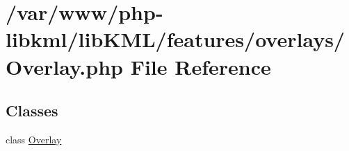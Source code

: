 \hypertarget{Overlay_8php}{
\section{/var/www/php-\/libkml/libKML/features/overlays/Overlay.php File Reference}
\label{dc/dff/Overlay_8php}
}
\subsection*{Classes}
\begin{DoxyCompactItemize}
\item 
class \hyperlink{classOverlay}{Overlay}
\end{DoxyCompactItemize}
